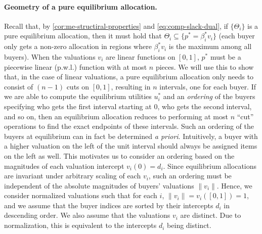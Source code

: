 \paragraph{Geometry of a pure equilibrium allocation.} 
Recall that, by \cref{cor:me-structiral-properties} and \cref{eq:comp-slack-dual}, if $\{\Theta_i\}$ is a pure equilibrium allocation, then it must hold that $\Theta_i \subseteq \{p^* = \beta^*_i v_i \}$ (each buyer only gets a non-zero allocation in regions where $\beta^*_i v_i$ is the maximum among all buyers). 
When the valuations $v_i$ are linear functions on $[0,1]$, $p^*$ must be a piecewise linear (p.w.l.) function with at most $n$ pieces. 
We will use this to show that, in the case of linear valuations, a pure equilibrium allocation only needs to consist of $(n-1)$ cuts on $[0,1]$, resulting in $n$ intervals, one for each buyer. 
If we are able to compute the equilibrium utilities $u^*_i$ and an \emph{ordering} of the buyers specifying who gets the first interval starting at $0$, who gets the second interval, and so on, then an equilibrium allocation reduces to performing at most $n$ ``cut'' operations to find the exact endpoints of these intervals. 
Such an ordering of the buyers at equilibrium can in fact be determined \emph{a priori}. 
Intuitively, a buyer with a higher valuation on the left of the unit interval should always be assigned items on the left as well. 
This motivates us to consider an ordering based on the magnitudes of each valuation intercept $v_i(0) = d_i$. 
Since equilibrium allocations are invariant under arbitrary scaling of each $v_i$, such an ordering must be independent of the absolute magnitudes of buyers' valuations $\|v_i\|$. 
Hence, we consider normalized valuations such that for each $i$, $\|v_i\| = v_i([0,1]) = 1$, and we assume that the buyer indices are sorted by their intercepts $d_i$ in descending order. 
We also assume that the valuations $v_i$ are distinct. Due to normalization, this is equivalent to the intercepts $d_i$ being distinct. 

